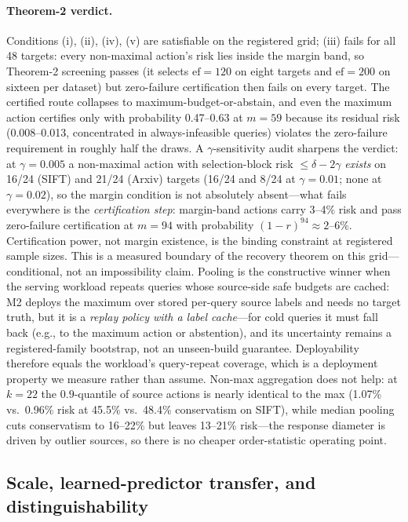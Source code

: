 \documentclass{article}
\begin{document}
\paragraph{Theorem-2 verdict.}
Conditions (i), (ii), (iv), (v) are satisfiable on the registered grid; (iii) fails for all 48 targets:
every non-maximal action's risk lies inside the margin band, so Theorem-2 screening passes (it selects
$\mathrm{ef}{=}120$ on eight targets and $\mathrm{ef}{=}200$ on sixteen per dataset) but zero-failure
certification then fails on every target. The certified route collapses to
maximum-budget-or-abstain, and even the maximum action certifies only with probability 0.47--0.63 at
$m=59$ because its residual risk (0.008--0.013, concentrated in always-infeasible queries) violates the
zero-failure requirement in roughly half the draws. A $\gamma$-sensitivity audit sharpens the verdict: at
$\gamma{=}0.005$ a non-maximal action with selection-block risk $\le\delta-2\gamma$ \emph{exists} on
16/24 (SIFT) and 21/24 (Arxiv) targets (16/24 and 8/24 at $\gamma{=}0.01$; none at $\gamma{=}0.02$), so
the margin condition is not absolutely absent---what fails everywhere is the \emph{certification step}:
margin-band actions carry 3--4\% risk and pass zero-failure certification at $m{=}94$ with probability
$(1-r)^{94}\approx2$--$6\%$. Certification power, not margin existence, is the binding constraint at
registered sample sizes. This is a measured boundary of the recovery theorem on this grid---conditional,
not an impossibility claim. Pooling is the constructive winner when the serving workload repeats queries whose source-side safe
budgets are cached: M2 deploys the maximum over stored per-query source labels and needs no target truth,
but it is a \emph{replay policy with a label cache}---for cold queries it must fall back (e.g., to the
maximum action or abstention), and its uncertainty remains a registered-family bootstrap, not an
unseen-build guarantee. Deployability therefore equals the workload's query-repeat coverage, which is a
deployment property we measure rather than assume. Non-max aggregation does not help: at $k{=}22$ the $0.9$-quantile of source
actions is nearly identical to the max (1.07\% vs.\ 0.96\% risk at 45.5\% vs.\ 48.4\% conservatism on
SIFT), while median pooling cuts conservatism to 16--22\% but leaves 13--21\% risk---the response
diameter is driven by outlier sources, so there is no cheaper order-statistic operating point.

\subsection{Scale, learned-predictor transfer, and distinguishability}
\label{sec:scale}
\end{document}
